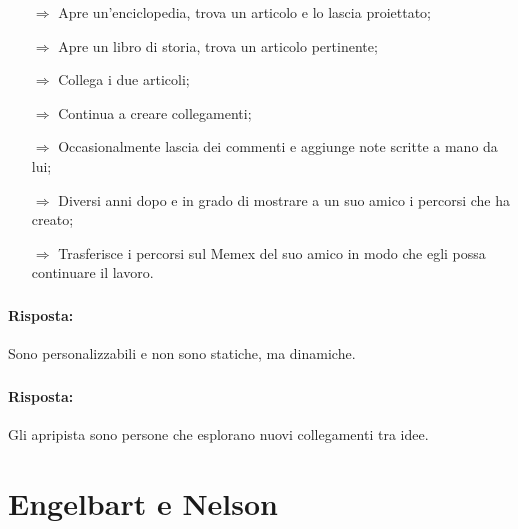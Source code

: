 \begin{itemize}
    \item [$\Rightarrow$] Apre un'enciclopedia, trova un articolo e lo lascia proiettato;
    \item [$\Rightarrow$] Apre un libro di storia, trova un articolo pertinente;
    \item [$\Rightarrow$] Collega i due articoli;
    \item [$\Rightarrow$] Continua a creare collegamenti;
    \item [$\Rightarrow$] Occasionalmente lascia dei commenti e aggiunge note scritte a mano da lui;
    \item [$\Rightarrow$] Diversi anni dopo e in grado di mostrare a un suo amico i percorsi che ha creato;
    \item [$\Rightarrow$] Trasferisce i percorsi sul Memex del suo amico in modo che egli possa continuare il lavoro.
\end{itemize}

\subsubsection{}


\paragraph{Risposta:} Sono personalizzabili e non sono statiche, ma dinamiche.

\subsubsection{}


\paragraph{Risposta:} Gli apripista sono persone che esplorano nuovi collegamenti tra idee.
\pagebreak
\section{Engelbart e Nelson}


